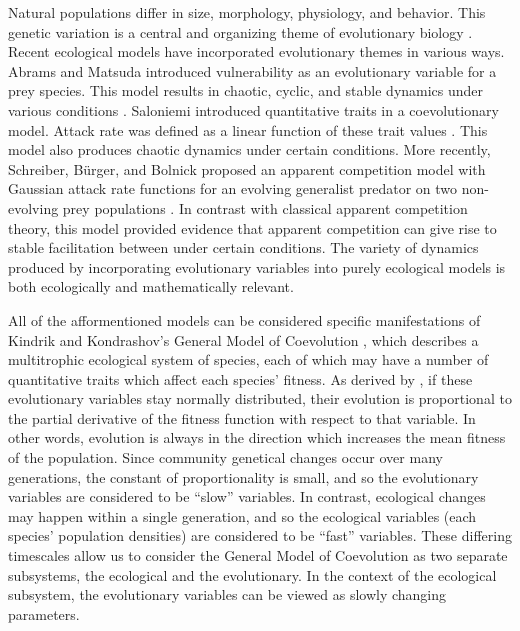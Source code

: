 \documentclass{amsart}
\theoremstyle{definition}
\theoremstyle{remark}
\numberwithin{equation}{section}
\begin{document}
Natural populations differ in size, morphology, physiology, and behavior.  This genetic variation is a central and organizing theme of evolutionary biology \cite{Schreiber_2011}.  Recent ecological models have incorporated evolutionary themes in various ways.  Abrams and Matsuda introduced vulnerability as an evolutionary variable for a prey species.  This model results in chaotic, cyclic, and stable dynamics under various conditions \cite{Abrams_Matsuda_1997}.  Saloniemi introduced quantitative traits in a coevolutionary model.  Attack rate was defined as a linear function of these trait values \cite{Saloniemi_1993}.  This model also produces chaotic dynamics under certain conditions.  More recently, Schreiber, B\"urger, and Bolnick proposed an apparent competition model with Gaussian attack rate functions for an evolving generalist predator on two non-evolving prey populations \cite{Schreiber_2011}.  In contrast with classical apparent competition theory, this model provided evidence that apparent competition can give rise to stable facilitation between under certain conditions.  The variety of dynamics produced by incorporating evolutionary variables into purely ecological models is both ecologically and mathematically relevant.

All of the afformentioned models can be considered specific manifestations of Kindrik and Kondrashov's General Model of Coevolution \cite{Kindrik_Kondrashov_1997}, which describes a multitrophic ecological system of species, each of which may have a number of quantitative traits which affect each species' fitness.  As derived by \cite{Lande_1976}, if these evolutionary variables stay normally distributed, their evolution is proportional to the partial derivative of the fitness function with respect to that variable.  In other words, evolution is always in the direction which increases the mean fitness of the population.  Since community genetical changes occur over many generations, the constant of proportionality is small, and so the evolutionary variables are considered to be ``slow'' variables.  In contrast, ecological changes may happen within a single generation, and so the ecological variables (each species' population densities) are considered to be ``fast'' variables.  These differing timescales allow us to consider the General Model of Coevolution as two separate subsystems, the ecological and the evolutionary.  In the context of the ecological subsystem, the evolutionary variables can be viewed as slowly changing parameters.

\end{document}
